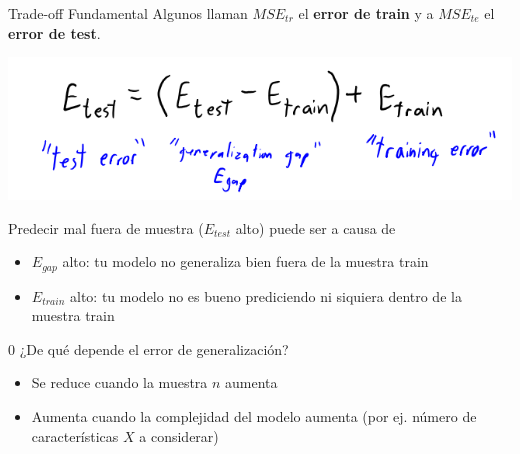 \documentclass[11pt,handout,aspectratio=169]{beamer}
\begin{document}
\begin{frame}{Trade-off Fundamental}
Algunos llaman $MSE_{tr}$ el \textbf{error de train} y a $MSE_{te}$ el \textbf{error de test}.

\begin{center}
\includegraphics[scale=0.5]{fundamental_tradeoff.png}
\end{center}

Predecir mal fuera de muestra ($E_{test}$ alto) puede ser a causa de 
\begin{itemize}
\item $E_{gap}$ alto: tu modelo no generaliza bien fuera de la muestra train 
\item  $E_{train}$ alto: tu modelo no es bueno prediciendo ni siquiera dentro de la muestra train 
\end{itemize}
\vspace{0.8cm}0
¿De qué depende el error de generalización?
\begin{itemize}
\item Se reduce cuando la muestra $n$ aumenta 
\item Aumenta cuando la complejidad del modelo aumenta (por ej. número de características $X$ a considerar)
\end{itemize}
\end{frame}
\end{document}
